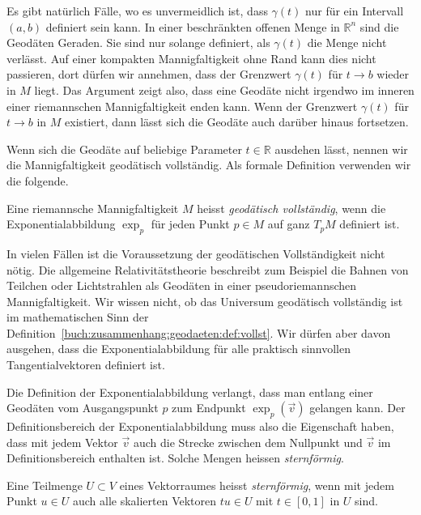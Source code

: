 Es gibt natürlich Fälle, wo es unvermeidlich ist, dass $\gamma(t)$
nur für ein Intervall $(a,b)$ definiert sein kann.
In einer beschränkten offenen Menge in $\mathbb{R}^n$ sind die Geodäten
Geraden.
Sie sind nur solange definiert, als $\gamma(t)$ die Menge
nicht verlässt.
Auf einer kompakten Mannigfaltigkeit ohne Rand kann dies nicht passieren,
dort dürfen wir annehmen, dass der Grenzwert $\gamma(t)$ für $t\to b$
wieder in $M$ liegt.
Das Argument zeigt also, dass eine Geodäte nicht irgendwo im inneren
einer riemannschen Mannigfaltigkeit enden kann.
Wenn der Grenzwert $\gamma(t)$ für $t\to b$ in $M$ existiert, dann
lässt sich die Geodäte auch darüber hinaus fortsetzen.

Wenn sich die Geodäte auf beliebige Parameter $t\in\mathbb{R}$
ausdehen lässt, nennen wir die Mannigfaltigkeit geodätisch vollständig.
Als formale Definition verwenden wir die folgende.

\begin{definition}
\label{buch:zusammenhang:geodaeten:def:vollst}
Eine riemannsche Mannigfaltigkeit $M$ heisst \emph{geodätisch vollständig},
wenn die Exponentialabbildung $\exp_p$ für jeden Punkt $p\in M$
auf ganz $T_pM$ definiert ist.
%
\end{definition}

In vielen Fällen ist die Voraussetzung der geodätischen Vollständigkeit
nicht nötig.
Die allgemeine Relativitätstheorie beschreibt zum Beispiel die Bahnen
von Teilchen oder Lichtstrahlen als Geodäten in einer pseudoriemannschen
Mannigfaltigkeit.
%
Wir wissen nicht, ob das Universum geodätisch vollständig ist im
mathematischen Sinn der
Definition~\ref{buch:zusammenhang:geodaeten:def:vollst}.
Wir dürfen aber davon ausgehen, dass die Exponentialabbildung für alle
praktisch sinnvollen Tangentialvektoren definiert ist.

Die Definition der Exponentialabbildung verlangt, dass man entlang einer
Geodäten vom Ausgangspunkt $p$ zum Endpunkt $\exp_p(\vec{v})$ gelangen
kann.
Der Definitionsbereich der Exponentialabbildung muss also die Eigenschaft
haben, dass mit jedem Vektor $\vec{v}$ auch die Strecke zwischen dem Nullpunkt
und $\vec{v}$ im Definitionsbereich enthalten ist.
Solche Mengen heissen \emph{sternförmig}.

\begin{definition}[sternförmig]
\label{buch:zusammenhang:geodaeten:def:sternfoermig}
Eine Teilmenge $U\subset V$ eines Vektorraumes heisst \emph{sternförmig},
wenn mit jedem Punkt $u\in U$ auch alle skalierten Vektoren $tu\in U$
mit $t\in [0,1]$ in $U$ sind.
%
\end{definition}

